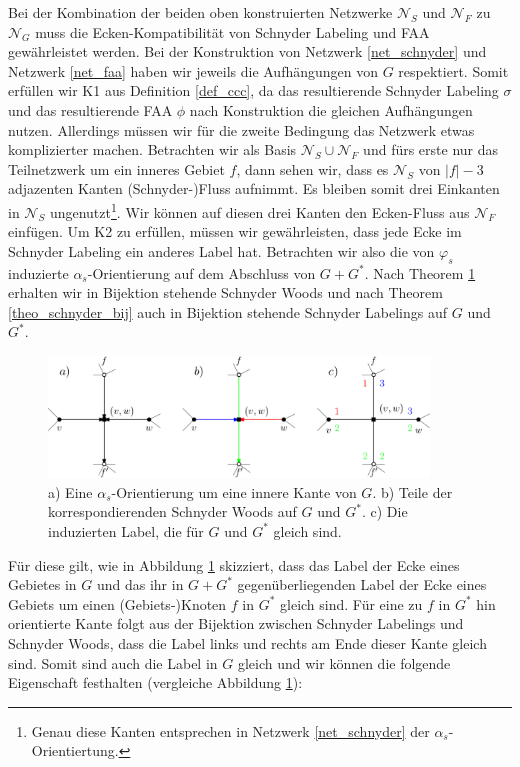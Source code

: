 Bei der Kombination der beiden oben konstruierten Netzwerke $\mathcal{N}_S$ und $\mathcal{N}_F$ zu $\mathcal{N}_G$ muss die Ecken-Kompatibilität von Schnyder Labeling und FAA gewährleistet werden. Bei der Konstruktion von Netzwerk \ref{net_schnyder} und Netzwerk \ref{net_faa} haben wir jeweils die Aufhängungen von $G$ respektiert. Somit erfüllen wir K1 aus Definition \ref{def_ccc}, da das resultierende Schnyder Labeling $\sigma$ und das resultierende FAA $\phi$ nach Konstruktion die gleichen Aufhängungen nutzen. Allerdings müssen wir für die zweite Bedingung das Netzwerk etwas komplizierter machen. Betrachten wir als Basis $\mathcal{N}_S \cup \mathcal{N}_F$ und fürs erste nur das Teilnetzwerk um ein inneres Gebiet $f$, dann sehen wir, dass es $\mathcal{N}_S$ von $|f|-3$ adjazenten Kanten (Schnyder-)Fluss aufnimmt. Es bleiben somit drei Einkanten in $\mathcal{N}_S$ ungenutzt\footnote{Genau diese Kanten entsprechen in Netzwerk \ref{net_schnyder} der $\alpha_s$-Orientiertung.}. Wir können auf diesen drei Kanten den Ecken-Fluss aus $\mathcal{N}_F$ einfügen. Um K2 zu erfüllen, müssen wir gewährleisten, dass jede Ecke im Schnyder Labeling ein anderes Label hat. Betrachten wir also die von $\varphi_s$ induzierte $\alpha_s$-Orientierung auf dem Abschluss von $G+G^*$. Nach Theorem \ref{alpha_bij} erhalten wir in Bijektion stehende Schnyder Woods und nach Theorem \ref{theo_schnyder_bij} auch in Bijektion stehende Schnyder Labelings auf $G$ und $G^*$.

\begin{figure}[h]
	\centering
  	\includegraphics[width=0.9\textwidth]{alpha_bij.png}
  	\caption{a) Eine $\alpha_s$-Orientierung um eine innere Kante von $G$. b) Teile der korrespondierenden Schnyder Woods auf $G$ und $G^*$. c) Die induzierten Label, die für $G$ und $G^*$ gleich sind.}
	\label{alpha_bij}
\end{figure}

Für diese gilt, wie in Abbildung \ref{alpha_bij} skizziert, dass das Label der Ecke eines Gebietes in $G$ und das ihr in $G+G^*$ gegenüberliegenden Label der Ecke eines Gebiets um einen (Gebiets-)Knoten $f$ in $G^*$ gleich sind. Für eine zu $f$ in $G^*$ hin orientierte Kante folgt aus der Bijektion zwischen Schnyder Labelings und Schnyder Woods, dass die Label links und rechts am Ende dieser Kante gleich sind. Somit sind auch die Label in $G$ gleich und wir können die folgende Eigenschaft festhalten (vergleiche Abbildung \ref{alpha_bij}):

